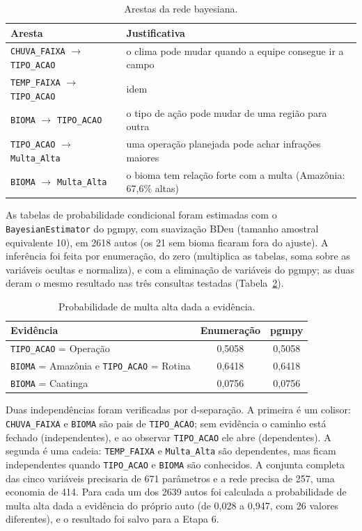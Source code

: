 \documentclass[11pt]{article}
\begin{document}
\begin{table}[H]
\centering
\small
\begin{tabular}{p{5.2cm}p{9.8cm}}
\toprule
Aresta & Justificativa \\
\midrule
\texttt{CHUVA\_FAIXA} $\to$ \texttt{TIPO\_ACAO} & o clima pode mudar quando a equipe consegue ir a campo \\
\texttt{TEMP\_FAIXA} $\to$ \texttt{TIPO\_ACAO} & idem \\
\texttt{BIOMA} $\to$ \texttt{TIPO\_ACAO} & o tipo de ação pode mudar de uma região para outra \\
\texttt{TIPO\_ACAO} $\to$ \texttt{Multa\_Alta} & uma operação planejada pode achar infrações maiores \\
\texttt{BIOMA} $\to$ \texttt{Multa\_Alta} & o bioma tem relação forte com a multa (Amazônia: 67,6\% altas) \\
\bottomrule
\end{tabular}
\caption{Arestas da rede bayesiana.}
\label{tab:arestas}
\end{table}

As tabelas de probabilidade condicional foram estimadas com o \texttt{BayesianEstimator} do pgmpy, com suavização BDeu (tamanho amostral equivalente 10), em 2618 autos (os 21 sem bioma ficaram fora do ajuste). A inferência foi feita por enumeração, do zero (multiplica as tabelas, soma sobre as variáveis ocultas e normaliza), e com a eliminação de variáveis do pgmpy; as duas deram o mesmo resultado nas três consultas testadas (Tabela~\ref{tab:inferencia}).

\begin{table}[H]
\centering
\small
\begin{tabular}{p{7.4cm}cc}
\toprule
Evidência & Enumeração & pgmpy \\
\midrule
\texttt{TIPO\_ACAO} = Operação & 0,5058 & 0,5058 \\
\texttt{BIOMA} = Amazônia e \texttt{TIPO\_ACAO} = Rotina & 0,6418 & 0,6418 \\
\texttt{BIOMA} = Caatinga & 0,0756 & 0,0756 \\
\bottomrule
\end{tabular}
\caption{Probabilidade de multa alta dada a evidência.}
\label{tab:inferencia}
\end{table}

Duas independências foram verificadas por d-separação. A primeira é um colisor: \texttt{CHUVA\_FAIXA} e \texttt{BIOMA} são pais de \texttt{TIPO\_ACAO}; sem evidência o caminho está fechado (independentes), e ao observar \texttt{TIPO\_ACAO} ele abre (dependentes). A segunda é uma cadeia: \texttt{TEMP\_FAIXA} e \texttt{Multa\_Alta} são dependentes, mas ficam independentes quando \texttt{TIPO\_ACAO} e \texttt{BIOMA} são conhecidos. A conjunta completa das cinco variáveis precisaria de 671 parâmetros e a rede precisa de 257, uma economia de 414. Para cada um dos 2639 autos foi calculada a probabilidade de multa alta dada a evidência do próprio auto (de 0,028 a 0,947, com 26 valores diferentes), e o resultado foi salvo para a Etapa 6.
\end{document}
